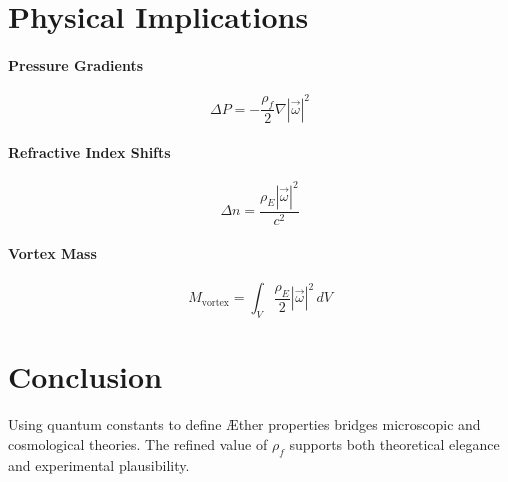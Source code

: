 \section{Physical Implications}

\paragraph{Pressure Gradients}
\[
\Delta P = -\frac{\rho_{\scriptscriptstyle\boldsymbol\!f}}{2} \nabla |\vec{\omega}|^2
\]

\paragraph{Refractive Index Shifts}
\[
\Delta n = \frac{\rho_{\scriptscriptstyle\boldsymbol\!E} |\vec{\omega}|^2}{c^2}
\]

\paragraph{Vortex Mass}
\[
M_{\text{vortex}} = \int_V \frac{\rho_{\scriptscriptstyle\boldsymbol\!E}}{2} |\vec{\omega}|^2 \, dV
\]

\section{Conclusion}

Using quantum constants to define Æther properties bridges microscopic and cosmological theories. The refined value of $\rho_{\scriptscriptstyle\boldsymbol\!f}$ supports both theoretical elegance and experimental plausibility.




